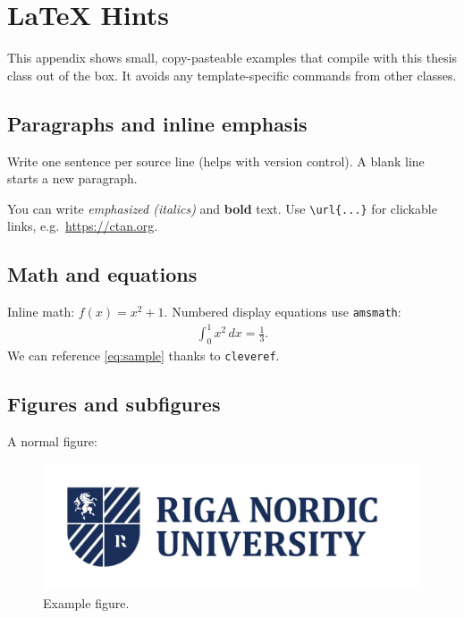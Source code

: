 \chapter{LaTeX Hints}
\label{chap:latexhints}


\newenvironment{twocoldemo}[1][]{%
  \par\noindent
  \begin{minipage}[t]{.48\linewidth}\raggedright
  \textbf{Code}\par\smallskip
}{%
  \end{minipage}\hfill
  \begin{minipage}[t]{.48\linewidth}\raggedright
  \textbf{Output}\par\smallskip
  \end{minipage}\par
}



This appendix shows small, copy-pasteable examples that compile with this thesis class out of the box. It avoids any template-specific commands from other classes.

\section{Paragraphs and inline emphasis}
Write one sentence per source line (helps with version control). A blank line starts a new paragraph.

You can write \emph{emphasized (italics)} and \textbf{bold} text. Use \verb|\url{...}| for clickable links, e.g.\ \url{https://ctan.org}.

\section{Math and equations}
Inline math: $f(x)=x^2+1$. Numbered display equations use \texttt{amsmath}:
\begin{align}
  \label{eq:sample}
  \int_0^1 x^2\,dx = \frac{1}{3}.
\end{align}
We can reference \cref{eq:sample} thanks to \texttt{cleveref}.

\section{Figures and subfigures}
A normal figure:
\begin{figure}[h]
  \centering
  \includegraphics[width=.7\linewidth]{b_chapters/chapter1/assets/RNU_large_logo.png}
  \caption{Example figure.}
  \label{fig:example}
\end{figure}

